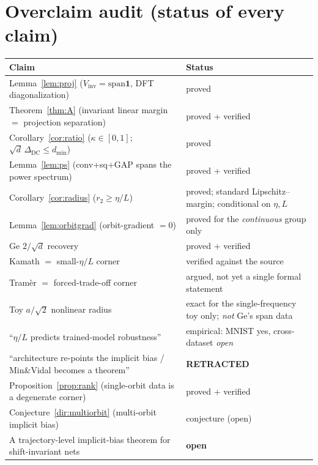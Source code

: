 \documentclass[11pt]{article}
\theoremstyle{plain}
\theoremstyle{definition}
\theoremstyle{remark}
\newcommand{\Vinv}{V_{\mathrm{inv}}}
\newcommand{\one}{\mathbf 1}
\begin{document}
\section{Overclaim audit (status of every claim)}\label{sec:audit}
\begin{center}\small
\begin{tabular}{p{}l}
\toprule
Claim & Status \\
\midrule
Lemma~\ref{lem:proj} ($\Vinv=\mathrm{span}\one$, DFT diagonalization) & proved \\
Theorem~\ref{thm:A} (invariant linear margin $=$ projection separation) & proved + verified \\
Corollary~\ref{cor:ratio} ($\kappa\in[0,1]$; $\sqrt d\,\Delta_{\mathrm{DC}}\le d_{\min}$) & proved \\
Lemma~\ref{lem:ps} (conv+sq+GAP spans the power spectrum) & proved + verified \\
Corollary~\ref{cor:radius} ($r_2\ge\eta/L$) & proved; standard Lipschitz--margin; conditional on $\eta,L$ \\
Lemma~\ref{lem:orbitgrad} (orbit-gradient $=0$) & proved for the \emph{continuous} group only \\
Ge $2/\sqrt d$ recovery & proved + verified \\
Kamath $=$ small-$\eta/L$ corner & verified against the source \\
Tramèr $=$ forced-trade-off corner & argued, not yet a single formal statement \\
Toy $a/\sqrt2$ nonlinear radius & exact for the single-frequency toy only; \emph{not} Ge's span data \\
``$\eta/L$ predicts trained-model robustness'' & empirical: MNIST yes, cross-dataset \emph{open} \\
``architecture re-points the implicit bias / Min\&Vidal becomes a theorem'' & \textbf{RETRACTED} \\
Proposition~\ref{prop:rank} (single-orbit data is a degenerate corner) & proved + verified \\
Conjecture~\ref{dir:multiorbit} (multi-orbit implicit bias) & conjecture (open) \\
A trajectory-level implicit-bias theorem for shift-invariant nets & \textbf{open} \\
\bottomrule
\end{tabular}
\end{center}
\end{document}
